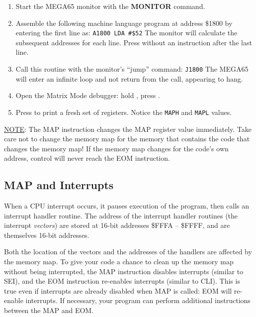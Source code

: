 \begin{enumerate}
\item Start the MEGA65 monitor with the {\bf MONITOR} command.
\item Assemble the following machine language program at address \$1800 by
entering the first line as: \texttt{A1800 LDA \#\$52} The monitor will calculate
the subsequent addresses for each line. Press  without an
instruction after the last line.


\item Call this routine with the monitor's ``jump'' command: \texttt{J1800} The
MEGA65 will enter an infinite loop and not return from the call, appearing to hang.
\item Open the Matrix Mode debugger: hold \megasymbolkey, press .
\item Press  to print a fresh set of registers. Notice the
\texttt{MAPH} and \texttt{MAPL} values.
\end{enumerate}

\underline{NOTE}: The MAP instruction changes the MAP register value immediately. Take care not to change the memory map for the memory that contains the code that changes the memory map! If the memory map changes for the code's own address, control will never reach the EOM instruction.

\subsection{MAP and Interrupts}

When a CPU interrupt occurs, it pauses execution of the program, then calls an
interrupt handler routine. The address of the interrupt handler routines (the
interrupt {\em vectors}) are stored at 16-bit addresses \$FFFA -- \$FFFF, and
are themselves 16-bit addresses.

Both the location of the vectors and the addresses of the handlers are
affected by the memory map. To give your code a chance to clean up the memory
map without being interrupted, the MAP instruction disables interrupts
(similar to SEI), and the EOM instruction re-enables interrupts (similar to
CLI). This is true even if interrupts are already disabled when MAP is called:
EOM will re-enable interrupts. If necessary, your program can perform
additional instructions between the MAP and EOM.

